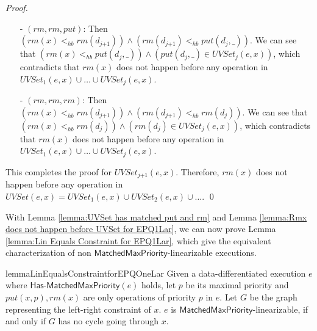 \begin {proof}
\begin{itemize}
\begin{itemize}
    \item[-] If $\textit{put}(d_{\textit{ind}},\_) <_{hb} \textit{rm}(d_{\textit{ind-1}})$, then we obtain $T_{\textit{ind-1}}$, which already contain contradiction.
    \end{itemize}

    By base case $1$, base case $2$ and the induction step, it is easy to see that for each $i$, $T_i$ contains contradiction. Therefore, $T_j$, the case of $(\textit{rm},\textit{put},\textit{rm})$, contains contradiction.

\item[-] $(\textit{rm},\textit{rm},\textit{put})$: Then $( \textit{rm}(x) <_{hb} \textit{rm}(d_{\textit{j+1}}) ) \wedge ( \textit{rm}(d_{\textit{j+1}}) <_{hb} \textit{put}(d_j,\_) )$. We can see that $( \textit{rm}(x) <_{hb} \textit{put}(d_j,\_) ) \wedge ( \textit{put}(d_j,\_) \in \textit{UVSet}_j(e,x) )$, which contradicts that $\textit{rm}(x)$ does not happen before any operation in $\textit{UVSet}_1(e,x) \cup \ldots \cup \textit{UVSet}_j(e,x)$.

\item[-] $(\textit{rm},\textit{rm},\textit{rm})$: Then $( \textit{rm}(x) <_{hb} \textit{rm}(d_{\textit{j+1}}) ) \wedge ( \textit{rm}(d_{\textit{j+1}}) <_{hb} \textit{rm}(d_j) )$. We can see that $( \textit{rm}(x) <_{hb} \textit{rm}(d_j) ) \wedge ( \textit{rm}(d_j) \in \textit{UVSet}_j(e,x) )$, which contradicts that $\textit{rm}(x)$ does not happen before any operation in $\textit{UVSet}_1(e,x) \cup \ldots \cup \textit{UVSet}_j(e,x)$.
\end{itemize}

This completes the proof for $\textit{UVSet}_{\textit{j+1}}(e,x)$. Therefore, $\textit{rm}(x)$ does not happen before any operation in $\textit{UVSet}(e,x) = \textit{UVSet}_1(e,x) \cup \textit{UVSet}_2(e,x) \cup \ldots$. \qed
\end {proof}

With Lemma \ref{lemma:UVSet has matched put and rm} and Lemma \ref{lemma:Rmx does not happen before UVSet for EPQ1Lar}, we can now prove Lemma \ref{lemma:Lin Equals Constraint for EPQ1Lar}, which give the equivalent characterization of non $\mathsf{MatchedMaxPriority}$-linearizable executions.

\begin{restatable}{lemma}{LinEqualsConstraintforEPQOneLar}
\label{lemma:Lin Equals Constraint for EPQ1Lar}
Given a data-differentiated execution $e$ where $\mathsf{Has\text{-}MatchedMaxPriority}(e)$ holds, let $p$ be its maximal priority and $\textit{put}(x,p),\textit{rm}(x)$ are only operations of priority $p$ in $e$. Let $G$ be the graph representing the left-right constraint of $x$. $e$ is $\mathsf{MatchedMaxPriority}$-linearizable, if and only if $G$ has no cycle going through $x$.
\end{restatable}

